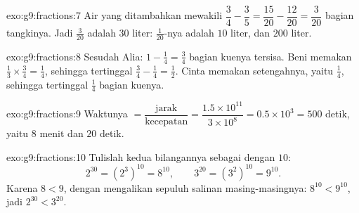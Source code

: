 \begin{solution}{exo:g9:fractions:7}
Air yang ditambahkan mewakili
$\dfrac34 - \dfrac35 = \dfrac{15}{20} - \dfrac{12}{20} = \dfrac{3}{20}$
bagian tangkinya. Jadi $\frac{3}{20}$  adalah $30$
liter: $\frac{1}{20}$-nya adalah $10$ liter, dan 
$200$ liter.
\end{solution}

\begin{solution}{exo:g9:fractions:8}
Sesudah Alia: $1 - \frac14 = \frac34$ bagian kuenya tersisa. Beni
memakan $\frac13 \times \frac34 = \frac14$, sehingga tertinggal
$\frac34 - \frac14 = \frac12$. Cinta memakan setengahnya, yaitu
$\frac14$, sehingga tertinggal $\frac14$ bagian kuenya.
\end{solution}

\begin{solution}{exo:g9:fractions:9}
Waktunya $= \dfrac{\text{jarak}}{\text{kecepatan}} =
\dfrac{1.5 \times 10^{11}}{3 \times 10^8} = 0.5 \times 10^3 = 500$
detik, yaitu $8$ menit dan $20$ detik.
\end{solution}

\begin{solution}{exo:g9:fractions:10}
Tulislah kedua bilangannya sebagai  dengan  $10$:
\[
2^{30} = \left(2^3\right)^{10} = 8^{10},
\qquad
3^{20} = \left(3^2\right)^{10} = 9^{10}.
\]
Karena $8 < 9$, dengan mengalikan sepuluh salinan masing-masingnya:
$8^{10} < 9^{10}$, jadi $2^{30} < 3^{20}$.
\end{solution}

